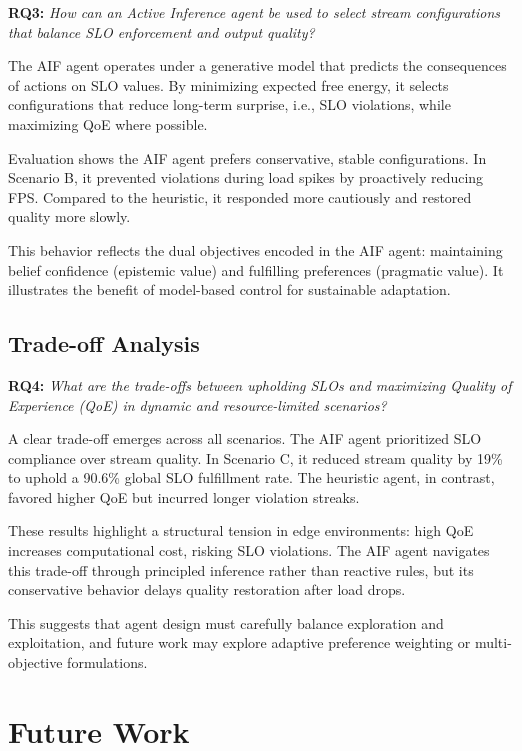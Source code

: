 \textbf{RQ3:} \textit{How can an Active Inference agent be used to select stream configurations that balance SLO enforcement and output quality?}

The AIF agent operates under a generative model that predicts the consequences of actions on SLO values. By minimizing expected free energy, it selects configurations that reduce long-term surprise, i.e., SLO violations, while maximizing QoE where possible.

Evaluation shows the AIF agent prefers conservative, stable configurations. In Scenario B, it prevented violations during load spikes by proactively reducing FPS. Compared to the heuristic, it responded more cautiously and restored quality more slowly.

This behavior reflects the dual objectives encoded in the AIF agent: maintaining belief confidence (epistemic value) and fulfilling preferences (pragmatic value). It illustrates the benefit of model-based control for sustainable adaptation.

\subsection{Trade-off Analysis}

\textbf{RQ4:} \textit{What are the trade-offs between upholding SLOs and maximizing Quality of Experience (QoE) in dynamic and resource-limited scenarios?}

A clear trade-off emerges across all scenarios. The AIF agent prioritized SLO compliance over stream quality. In Scenario C, it reduced stream quality by 19\% to uphold a 90.6\% global SLO fulfillment rate. The heuristic agent, in contrast, favored higher QoE but incurred longer violation streaks.

These results highlight a structural tension in edge environments: high QoE increases computational cost, risking SLO violations. The AIF agent navigates this trade-off through principled inference rather than reactive rules, but its conservative behavior delays quality restoration after load drops.

This suggests that agent design must carefully balance exploration and exploitation, and future work may explore adaptive preference weighting or multi-objective formulations.

\section{Future Work}

